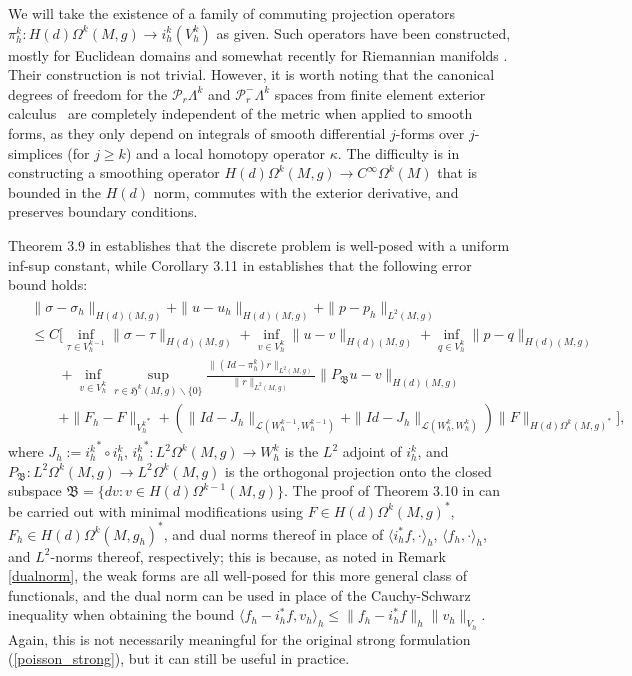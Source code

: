 \documentclass[11pt]{article}
\newcommand{\iprod}[1]{\langle #1 \rangle}
\begin{document}
We will take the existence of a family of commuting projection operators $\pi_h^k: H(d)\Omega^k(M,g) \to i_h^k(V_h^k)$ as given. Such operators have been constructed, mostly for Euclidean domains \cite{Christiansen-Winther} and somewhat recently for Riemannian manifolds \cite{Licht}. Their construction is not trivial. However, it is worth noting that the canonical degrees of freedom for the $\mathcal{P}_r\Lambda^k$ and $\mathcal{P}_r^-\Lambda^k$ spaces from finite element exterior calculus~\cite{Arnold-Winther} are completely independent of the metric when applied to smooth forms, as they only depend on integrals of smooth differential $j$-forms over $j$-simplices (for $j \ge k$) and a local homotopy operator $\kappa$. The difficulty is in constructing a smoothing operator $H(d)\Omega^k(M,g) \to C^\infty\Omega^k(M)$ that is bounded in the $H(d)$ norm, commutes with the exterior derivative, and preserves boundary conditions.

Theorem 3.9 in \cite{Holst-Stern} establishes that the discrete problem is well-posed with a uniform inf-sup constant, while Corollary 3.11 in \cite{Holst-Stern} establishes that the following error bound holds: 
\begin{align}\label{errbounds}
\begin{split}
&\|\sigma - \sigma_h\|_{H(d)(M,g)} + \|u - u_h\|_{H(d)(M,g)} + \|p - p_h\|_{L^2(M,g)}\\
&\le C\Bigg[\inf_{\tau \in V_h^{k - 1}} \| \sigma - \tau\|_{H(d)(M,g)} + \inf_{v \in V_h^k} \|u - v\|_{H(d)(M,g)} + \inf_{q \in V_h^k} \|p - q\|_{H(d)(M,g)}\\
&\quad\quad+\inf_{v \in V_h^k}\sup_{r \in \mathfrak H^k(M,g)\backslash \{0\}} \frac{\|(Id - \pi_h^k)r\|_{L^2(M,g)}}{\|r\|_{L^2(M,g)}}\|P_{\mathfrak{B}}u - v\|_{H(d)(M,g)}\\
&\quad\quad+\|F_h - F\|_{{V_h^k}^*} + \left(\|Id - J_h\|_{\mathcal{L}(W_h^{k-1},W_h^{k-1})} + \|Id - J_h\|_{\mathcal{L}(W_h^k,W_h^k)}\right)\|F\|_{H(d)\Omega^k(M,g)^*}\Bigg],
\end{split}\end{align}
where $J_h := {i_h^k}^* \circ i_h^k$, ${i_h^k}^*: L^2\Omega^k(M,g) \to W_h^k$ is the $L^2$ adjoint of $i_h^k$, and $P_\mathfrak{B}: L^2\Omega^k(M,g) \to L^2\Omega^k(M,g)$ is the orthogonal projection onto the closed subspace $\mathfrak{B} = \{ dv : v \in H(d)\Omega^{k-1}(M,g)\}$. The proof of Theorem 3.10 in \cite{Holst-Stern} can be carried out with minimal modifications using $F \in H(d)\Omega^k(M,g)^*$, $F_h \in H(d)\Omega^k(M,g_h)^*$, and dual norms thereof in place of $\iprod{i_h^*f,\cdot}_h$, $\iprod{f_h,\cdot}_h$, and $L^2$-norms thereof, respectively; this is because, as noted in Remark \ref{dualnorm}, the weak forms are all well-posed for this more general class of functionals, and the dual norm can be used in place of the Cauchy-Schwarz inequality when obtaining the bound $\iprod{f_h - i_h^* f, v_h}_h \le \|f_h - i_h^*f\|_h\|v_h\|_{V_h}$. Again, this is not necessarily meaningful for the original strong formulation (\ref{poisson_strong}), but it can still be useful in practice. 
\end{document}
